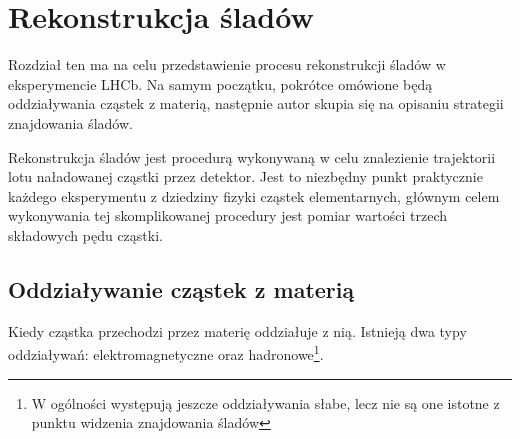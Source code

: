 \chapter{Rekonstrukcja śladów}

Rozdział ten ma na celu przedstawienie procesu rekonstrukcji śladów w eksperymencie LHCb. Na samym początku, pokrótce omówione będą oddziaływania cząstek z materią, następnie autor skupia się na opisaniu strategii znajdowania śladów. 

Rekonstrukcja śladów jest procedurą wykonywaną w celu znalezienie trajektorii lotu naładowanej cząstki przez detektor. Jest to niezbędny punkt praktycznie każdego eksperymentu z dziedziny fizyki cząstek elementarnych, głównym celem wykonywania tej skomplikowanej procedury jest pomiar wartości trzech składowych pędu cząstki. 

\section{Oddziaływanie cząstek z materią}
Kiedy cząstka przechodzi przez materię oddziałuje z nią. Istnieją dwa typy oddziaływań: elektromagnetyczne oraz hadronowe\footnote{W ogólności występują jeszcze oddziaływania słabe, lecz nie są one istotne z punktu widzenia znajdowania śladów}. 
